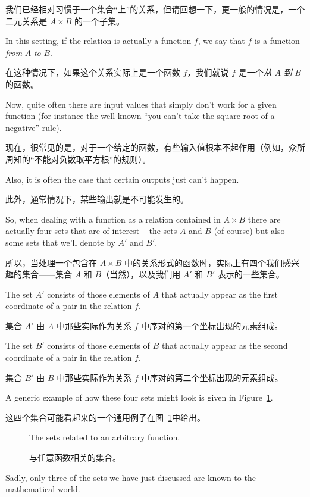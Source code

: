 我们已经相对习惯于一个集合“上”的关系，但请回想一下，更一般的情况是，一个二元关系是 $A \times B$ 的一个子集。

In this setting, if the relation is 
actually a function $f$, we say that $f$ is a function \emph{from} $A$
\emph{to} $B$.

在这种情况下，如果这个关系实际上是一个函数 $f$，我们就说 $f$ 是一个\emph{从} $A$ \emph{到} $B$ 的函数。

Now, quite often there are input values  that simply don't 
work for a given function (for instance the well-known ``you can't take
the square root of a negative'' rule).

现在，很常见的是，对于一个给定的函数，有些输入值根本不起作用（例如，众所周知的“不能对负数取平方根”的规则）。

Also, it is often the case that
certain outputs just can't happen.

此外，通常情况下，某些输出就是不可能发生的。

So, when dealing with a function
as a relation contained in $A \times B$ there are actually four sets
that are of interest -- the sets $A$ and $B$ (of course) but also some
sets that we'll denote by $A'$ and $B'$.

所以，当处理一个包含在 $A \times B$ 中的关系形式的函数时，实际上有四个我们感兴趣的集合——集合 $A$ 和 $B$（当然），以及我们用 $A'$ 和 $B'$ 表示的一些集合。

The set $A'$ consists of those
elements of $A$ that actually appear as the first coordinate of a pair
in the relation $f$.

集合 $A'$ 由 $A$ 中那些实际作为关系 $f$ 中序对的第一个坐标出现的元素组成。

The set $B'$ consists of those elements of $B$
that actually appear as the second coordinate of a pair in the relation $f$.

集合 $B'$ 由 $B$ 中那些实际作为关系 $f$ 中序对的第二个坐标出现的元素组成。

A generic example of how these four sets might look is given in Figure~\ref{fig:generic_function}.

这四个集合可能看起来的一个通用例子在图~\ref{fig:generic_function}中给出。

\begin{figure}[!hbtp]

\caption{The sets related to an arbitrary function.}
\caption{与任意函数相关的集合。}
\label{fig:generic_function} 
\end{figure}

Sadly, only three of the sets we have just discussed are known to
the mathematical world.

